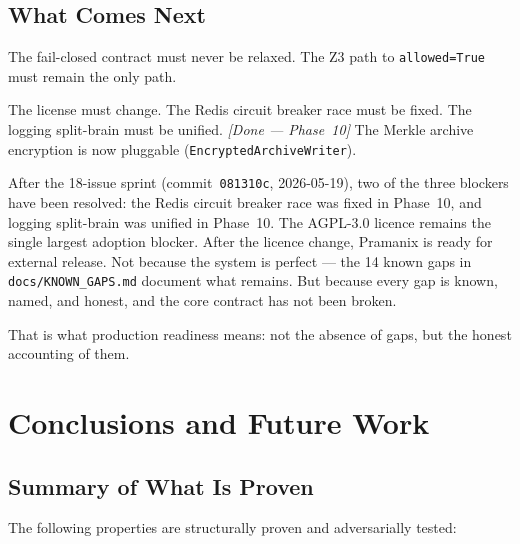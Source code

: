 \documentclass[12pt,a4paper,oneside]{report}
\newcommand{\fname}[1]{\texttt{#1}}          %
\newcommand{\code}[1]{\texttt{#1}}           %
\begin{document}
\section{What Comes Next}

The fail-closed contract must never be relaxed. The Z3 path to
\code{allowed=True} must remain the only path.

The license must change. The Redis circuit breaker race must be fixed. The
logging split-brain must be unified.  \textit{[Done --- Phase~10]} The Merkle
archive encryption is now pluggable (\code{EncryptedArchiveWriter}).

After the 18-issue sprint (commit~\code{081310c}, 2026-05-19), two of the
three blockers have been resolved: the Redis circuit breaker race was fixed
in Phase~10, and logging split-brain was unified in Phase~10.  The
AGPL-3.0 licence remains the single largest adoption blocker.
After the licence change, Pramanix is ready for external release. Not because
the system is perfect --- the 14 known gaps in \fname{docs/KNOWN\_GAPS.md}
document what remains. But because every gap is known, named, and honest, and
the core contract has not been broken.

That is what production readiness means: not the absence of gaps, but the
honest accounting of them.

\chapter{Conclusions and Future Work}

\section{Summary of What Is Proven}

The following properties are structurally proven and adversarially tested:
\end{document}
